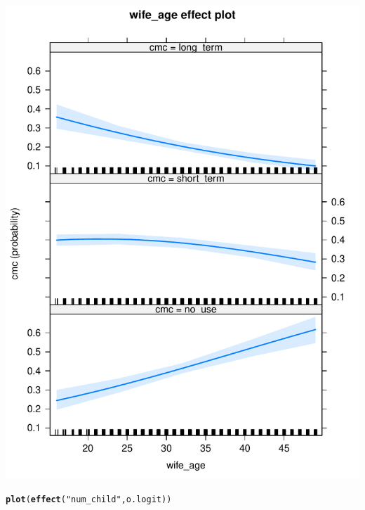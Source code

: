 \documentclass[onesided]{article}\usepackage[]{graphicx}\usepackage[]{color}
\makeatletter
\def\maxwidth{ %
  \ifdim\Gin@nat@width>\linewidth
    \linewidth
  \else
    \Gin@nat@width
  \fi
}
\newcommand{\hlstr}[1]{\textcolor[rgb]{0.192,0.494,0.8}{#1}}%
\newcommand{\hlstd}[1]{\textcolor[rgb]{0.345,0.345,0.345}{#1}}%
\newcommand{\hlkwd}[1]{\textcolor[rgb]{0.737,0.353,0.396}{\textbf{#1}}}%
\newenvironment{kframe}{%
 \def\at@end@of@kframe{}%
 \ifinner\ifhmode%
  \def\at@end@of@kframe{\end{minipage}}%
  \begin{minipage}{\columnwidth}%
 \fi\fi%
 \def\FrameCommand##1{\hskip\@totalleftmargin \hskip-\fboxsep
 \colorbox{shadecolor}{##1}\hskip-\fboxsep
     \hskip-\linewidth \hskip-\@totalleftmargin \hskip\columnwidth}%
 \MakeFramed {\advance\hsize-\width
   \@totalleftmargin\z@ \linewidth\hsize
   \@setminipage}}%
 {\par\unskip\endMakeFramed%
 \at@end@of@kframe}
\newenvironment{knitrout}{}{} %
\makeatother
\begin{document}
\begin{knitrout}
{\centering \includegraphics[width=\maxwidth]{figure/pp-2} 

}


\begin{kframe}\begin{alltt}
\hlkwd{plot}\hlstd{(}\hlkwd{effect}\hlstd{(}\hlstr{"num_child"}\hlstd{, o.logit))}
\end{alltt}
\end{kframe}


\end{knitrout}
\end{document}
